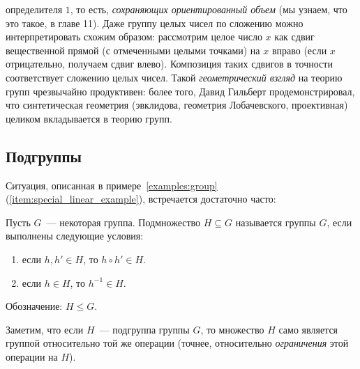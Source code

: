 \begin{examples}
\begin{enumerate}
  определителя $1$, то есть, {\it сохраняющих ориентированный объем}
  (мы узнаем, что это такое, в главе 11). Даже группу целых чисел по
  сложению можно интерпретировать схожим образом: рассмотрим целое
  число $x$ как сдвиг вещественной прямой (с отмеченными целыми
  точками) на $x$ вправо (если $x$ отрицательно, получаем сдвиг
  влево). Композиция таких сдвигов в точности соответствует сложению
  целых чисел. Такой {\it геометрический взгляд} на теорию групп
  чрезвычайно продуктивен: более того, Давид Гильберт
  продемонстрировал, что синтетическая геометрия (эвклидова, геометрия
  Лобачевского, проективная) целиком вкладывается в теорию групп.
\end{enumerate}
\end{examples}

\subsection{Подгруппы}


Ситуация, описанная в примере~\ref{examples:group}
(\ref{item:special_linear_example}),
встречается достаточно часто:
\begin{definition}\label{def:subgroup}
Пусть $G$~--- некоторая группа. Подмножество $H\subseteq G$ называется
 группы $G$, если выполнены следующие
условия:
\begin{enumerate}
\item если $h,h'\in H$, то $h\circ h'\in H$.
\item если $h\in H$, то $h^{-1}\in H$.
\end{enumerate}
Обозначение: $H\leq G$.
\end{definition}
Заметим, что если $H$~--- подгруппа группы $G$, то множество $H$ само
является группой относительно той же операции (точнее, относительно
{\em ограничения} этой операции на $H$).

